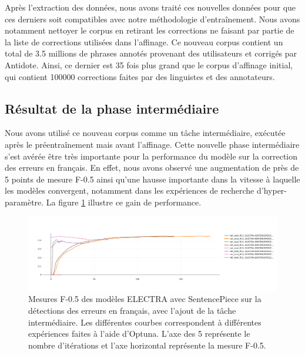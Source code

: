 \documentclass[12pt,twoside,maitrise]{dms}
\theoremstyle{definition}
\numberwithin{equation}{section}
\numberwithin{table}{chapter}
\numberwithin{figure}{chapter}
\begin{document}
Après l'extraction des données, nous avons traité ces nouvelles données pour
que ces derniers soit compatibles avec notre méthodologie d'entraînement. Nous
avons notamment nettoyer le corpus en retirant les corrections ne faisant par
partie de la liste de corrections utilisées dans l'affinage. Ce nouveau corpus
contient un total de 3.5 millions de phrases annotés provenant des utilisateurs
et corrigés par Antidote. Ainsi, ce dernier est 35 fois plus grand que le
corpus d'affinage initial, qui contient 100000 corrections faites par des
linguistes et des annotateurs.

\subsection{Résultat de la phase intermédiaire}
Nous avons utilisé ce nouveau corpus comme un tâche intermédiaire, exécutée
après le préentraînement mais avant l'affinage. Cette nouvelle phase
intermédiaire s'est avérée être très importante pour la performance du modèle
sur la correction des erreurs en français. En effet, nous avons observé une
augmentation de près de 5 points de mesure F-0.5 ainsi qu'une hausse importante
dans la vitesse à laquelle les modèles convergent, notamment dans les
expériences de recherche d'hyper-paramètre. La figure \ref{fig:electraaweb}
illustre ce gain de performance.

\begin{figure}
	\begin{center}
		\includegraphics[width=1.0\textwidth]{figures/electrasentencepieceawebf05optuna.png}
	\end{center}
	\caption{Mesures F-0.5 des modèles ELECTRA avec SentencePiece sur la détections des erreurs en français, avec l'ajout de la tâche intermédiaire. Les différentes courbes correspondent à différentes expériences faites à l'aide d'Optuna. L'axe des 5 représente le nombre d'itérations et l'axe horizontal représente la mesure F-0.5.}\label{fig:electraaweb}
\end{figure}
\end{document}
